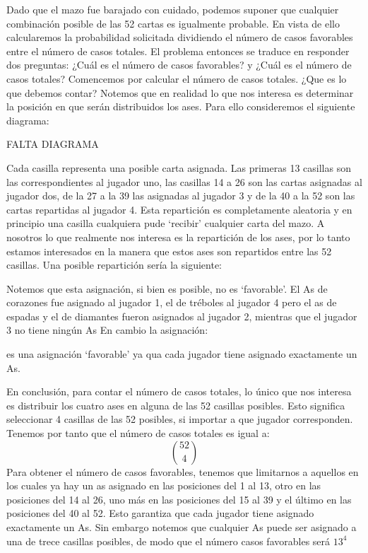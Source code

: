 \documentclass[14pt]{extreport}
\begin{document}
Dado que el mazo fue barajado con cuidado, podemos suponer que cualquier combinación posible de las 52 cartas es igualmente probable. En vista de ello calcularemos la probabilidad solicitada dividiendo el número de casos favorables entre el número de casos totales. El problema entonces se traduce en responder dos preguntas: ¿Cuál es el número de casos favorables? y ¿Cuál es el número de casos totales? Comencemos por calcular el número de casos totales. ¿Que es lo que debemos contar? Notemos que en realidad lo que nos interesa es determinar la posición en que serán distribuidos los ases. Para ello consideremos el siguiente diagrama:

\begin{center}
  FALTA DIAGRAMA
\end{center}

Cada casilla representa una posible carta asignada. Las primeras 13 casillas son las correspondientes al jugador uno, las casillas 14 a 26 son las cartas asignadas al jugador dos, de la 27 a la 39 las asignadas al jugador 3 y de la 40 a la 52 son las cartas repartidas al jugador 4. Esta repartición es completamente aleatoria y en principio una casilla cualquiera pude `recibir' cualquier carta del mazo. A nosotros lo que realmente nos interesa es la repartición de los ases, por lo tanto estamos interesados en la manera que estos ases son repartidos entre las 52 casillas. Una posible repartición sería la siguiente:


Notemos que esta asignación, si bien es posible, no es `favorable'. El As de corazones fue asignado al jugador 1, el de tréboles al jugador 4 pero el as de espadas y el de diamantes fueron asignados al jugador 2, mientras que el jugador 3 no tiene ningún As En cambio la asignación:

es una asignación `favorable' ya qua cada jugador tiene asignado exactamente un As.

En conclusión, para contar el número de casos totales, lo único que nos interesa es distribuir los cuatro ases en alguna de las 52 casillas posibles. Esto significa seleccionar 4 casillas de las 52 posibles, si importar a que jugador corresponden. Tenemos por tanto que el número de casos totales es igual a:
$$
  \binom{52}{4}
$$
Para obtener el número de casos favorables, tenemos que limitarnos a aquellos en los cuales ya hay un as asignado en las posiciones del 1 al 13, otro en las posiciones del 14 al 26, uno más en las posiciones del 15 al 39 y el último en las posiciones del 40 al 52. Esto garantiza que cada jugador tiene asignado exactamente un As. Sin embargo notemos que cualquier As puede ser asignado a una de trece casillas posibles, de modo que el número casos favorables será $13^4$
\end{document}
